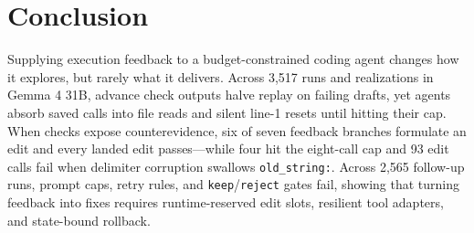 \section{Conclusion}
Supplying execution feedback to a budget-constrained coding agent changes how it explores, but rarely what it delivers. Across 3,517 runs and realizations in Gemma 4 31B, advance check outputs halve replay on failing drafts, yet agents absorb saved calls into file reads and silent line-1 resets until hitting their cap. When checks expose counterevidence, six of seven feedback branches formulate an edit and every landed edit passes---while four hit the eight-call cap and 93 edit calls fail when delimiter corruption swallows \texttt{old\_string:}. Across 2,565 follow-up runs, prompt caps, retry rules, and \texttt{keep}/\texttt{reject} gates fail, showing that turning feedback into fixes requires runtime-reserved edit slots, resilient tool adapters, and state-bound rollback.
